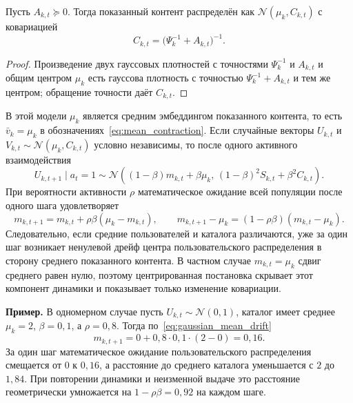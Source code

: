 \begin{proposition}
\label{prop:serving_cov}
Пусть $A_{k,t}\succeq0$. Тогда показанный контент распределён как
$\mathcal N(\mu_k,C_{k,t})$ с ковариацией
\[
    C_{k,t} = \bigl(\Psi_k^{-1}+A_{k,t}\bigr)^{-1}.
\]
\end{proposition}

\begin{proof}
Произведение двух гауссовых плотностей с точностями
$\Psi_k^{-1}$ и $A_{k,t}$ и общим центром $\mu_k$ есть гауссова плотность с
точностью $\Psi_k^{-1}+A_{k,t}$ и тем же центром; обращение точности даёт
$C_{k,t}$.
\end{proof}

В этой модели $\mu_k$ является средним эмбеддингом показанного контента, то есть
$\bar v_k=\mu_k$ в обозначениях~\eqref{eq:mean_contraction}. Если случайные
векторы $U_{k,t}$ и $V_{k,t}\sim\mathcal N(\mu_k,C_{k,t})$ условно независимы,
то после одного активного взаимодействия
\begin{equation}
    U_{k,t+1}\mid a_t=1
    \sim\mathcal N\!\left(
        (1-\beta)m_{k,t}+\beta\mu_k,\,
        (1-\beta)^2S_{k,t}+\beta^2C_{k,t}
    \right).
    \label{eq:gaussian_one_step}
\end{equation}
При вероятности активности $\rho$ математическое ожидание всей популяции после
одного шага удовлетворяет
\begin{equation}
    m_{k,t+1}
    =m_{k,t}+\rho\beta(\mu_k-m_{k,t}),
    \qquad
    m_{k,t+1}-\mu_k
    =(1-\rho\beta)(m_{k,t}-\mu_k).
    \label{eq:gaussian_mean_drift}
\end{equation}
Следовательно, если средние пользователей и каталога различаются, уже за один
шаг возникает ненулевой дрейф центра пользовательского распределения в сторону
среднего показанного контента. В частном случае $m_{k,t}=\mu_k$ сдвиг среднего
равен нулю, поэтому центрированная постановка скрывает этот компонент динамики и
показывает только изменение ковариации.

\textbf{Пример.} В одномерном случае пусть
$U_{k,t}\sim\mathcal N(0,1)$, каталог имеет среднее $\mu_k=2$,
$\beta=0{,}1$, а $\rho=0{,}8$. Тогда по~\eqref{eq:gaussian_mean_drift}
\[
    m_{k,t+1}=0+0{,}8\cdot0{,}1\cdot(2-0)=0{,}16.
\]
За один шаг математическое ожидание пользовательского распределения смещается
от $0$ к $0{,}16$, а расстояние до среднего каталога уменьшается с $2$ до
$1{,}84$. При повторении динамики и неизменной выдаче это расстояние
геометрически умножается на $1-\rho\beta=0{,}92$ на каждом шаге.

